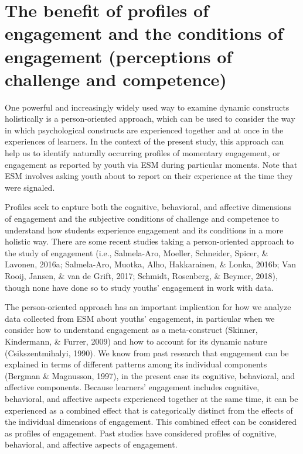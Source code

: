 \documentclass[]{msu-thesis}
\theoremstyle{definition}
\theoremstyle{definition}
\theoremstyle{definition}
\theoremstyle{remark}
\begin{document}
\section{The benefit of profiles of engagement and the conditions of
engagement (perceptions of challenge and
competence)}\label{the-benefit-of-profiles-of-engagement-and-the-conditions-of-engagement-perceptions-of-challenge-and-competence}

One powerful and increasingly widely used way to examine dynamic
constructs holistically is a person-oriented approach, which can be used
to consider the way in which psychological constructs are experienced
together and at once in the experiences of learners. In the context of
the present study, this approach can help us to identify naturally
occurring profiles of momentary engagement, or engagement as reported by
youth via ESM during particular moments. Note that ESM involves asking
youth about to report on their experience at the time they were
signaled.

Profiles seek to capture both the cognitive, behavioral, and affective
dimensions of engagement and the subjective conditions of challenge and
competence to understand how students experience engagement and its
conditions in a more holistic way. There are some recent studies taking
a person-oriented approach to the study of engagement (i.e.,
Salmela-Aro, Moeller, Schneider, Spicer, \& Lavonen, 2016a; Salmela-Aro,
Muotka, Alho, Hakkarainen, \& Lonka, 2016b; Van Rooij, Jansen, \& van de
Grift, 2017; Schmidt, Rosenberg, \& Beymer, 2018), though none have done
so to study youths' engagement in work with data.

The person-oriented approach has an important implication for how we
analyze data collected from ESM about youths' engagement, in particular
when we consider how to understand engagement as a meta-construct
(Skinner, Kindermann, \& Furrer, 2009) and how to account for its
dynamic nature (Csikszentmihalyi, 1990). We know from past research that
engagement can be explained in terms of different patterns among its
individual components (Bergman \& Magnusson, 1997), in the present case
its cognitive, behavioral, and affective components. Because learners'
engagement includes cognitive, behavioral, and affective aspects
experienced together at the same time, it can be experienced as a
combined effect that is categorically distinct from the effects of the
individual dimensions of engagement. This combined effect can be
considered as profiles of engagement. Past studies have considered
profiles of cognitive, behavioral, and affective aspects of engagement.
\end{document}
